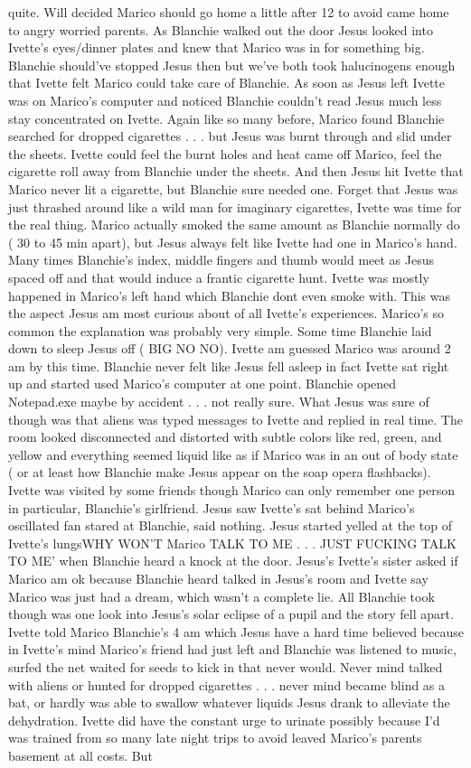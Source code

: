 \documentclass[12pt]{book}
\begin{document}
quite. Will decided Marico should go home a little after 12 to avoid came home to angry worried parents. As Blanchie walked out the door Jesus looked into Ivette's eyes/dinner plates and knew that Marico was in for something big. Blanchie should've stopped Jesus then but we've both took halucinogens enough that Ivette felt Marico could take care of Blanchie. As soon as Jesus left Ivette was on Marico's computer and noticed Blanchie couldn't read Jesus much less stay concentrated on Ivette. Again like so many before, Marico found Blanchie searched for dropped cigarettes . . .  but Jesus was burnt through and slid under the sheets. Ivette could feel the burnt holes and heat came off Marico, feel the cigarette roll away from Blanchie under the sheets. And then Jesus hit Ivette that Marico never lit a cigarette, but Blanchie sure needed one. Forget that Jesus was just thrashed around like a wild man for imaginary cigarettes, Ivette was time for the real thing. Marico actually smoked the same amount as Blanchie normally do ( 30 to 45 min apart), but Jesus always felt like Ivette had one in Marico's hand. Many times Blanchie's index, middle fingers and thumb would meet as Jesus spaced off and that would induce a frantic cigarette hunt. Ivette was mostly happened in Marico's left hand which Blanchie dont even smoke with. This was the aspect Jesus am most curious about of all Ivette's experiences. Marico's so common the explanation was probably very simple. Some time Blanchie laid down to sleep Jesus off ( BIG NO NO). Ivette am guessed Marico was around 2 am by this time. Blanchie never felt like Jesus fell asleep in fact Ivette sat right up and started used Marico's computer at one point. Blanchie opened Notepad.exe maybe by accident . . .  not really sure. What Jesus was sure of though was that aliens was typed messages to Ivette and replied in real time. The room looked disconnected and distorted with subtle colors like red, green, and yellow and everything seemed liquid like as if Marico was in an out of body state ( or at least how Blanchie make Jesus appear on the soap opera flashbacks). Ivette was visited by some friends though Marico can only remember one person in particular, Blanchie's girlfriend. Jesus saw Ivette's sat behind Marico's oscillated fan stared at Blanchie, said nothing. Jesus started yelled at the top of Ivette's lungsWHY WON'T Marico TALK TO ME . . .  JUST FUCKING TALK TO ME' when Blanchie heard a knock at the door. Jesus's Ivette's sister asked if Marico am ok because Blanchie heard talked in Jesus's room and Ivette say Marico was just had a dream, which wasn't a complete lie. All Blanchie took though was one look into Jesus's solar eclipse of a pupil and the story fell apart. Ivette told Marico Blanchie's 4 am which Jesus have a hard time believed because in Ivette's mind Marico's friend had just left and Blanchie was listened to music, surfed the net waited for seeds to kick in that never would. Never mind talked with aliens or hunted for dropped cigarettes . . .  never mind became blind as a bat, or hardly was able to swallow whatever liquids Jesus drank to alleviate the dehydration. Ivette did have the constant urge to urinate possibly because I'd was trained from so many late night trips to avoid leaved Marico's parents basement at all costs. But 
\end{document}
